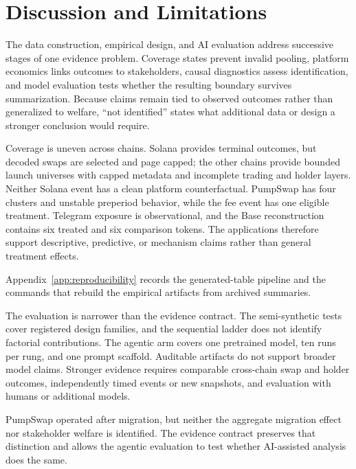 \documentclass{article}
\begin{document}
\section{Discussion and Limitations}
\label{sec:discussion}

The data construction, empirical design, and AI evaluation address successive stages of one evidence problem. Coverage states prevent invalid pooling, platform economics links outcomes to stakeholders, causal diagnostics assess identification, and model evaluation tests whether the resulting boundary survives summarization. Because claims remain tied to observed outcomes rather than generalized to welfare, ``not identified'' states what additional data or design a stronger conclusion would require.

Coverage is uneven across chains. Solana provides terminal outcomes, but decoded swaps are selected and page capped; the other chains provide bounded launch universes with capped metadata and incomplete trading and holder layers. Neither Solana event has a clean platform counterfactual. PumpSwap has four clusters and unstable preperiod behavior, while the fee event has one eligible treatment. Telegram exposure is observational, and the Base reconstruction contains six treated and six comparison tokens. The applications therefore support descriptive, predictive, or mechanism claims rather than general treatment effects.

Appendix~\ref{app:reproducibility} records the generated-table pipeline and the commands that rebuild the empirical artifacts from archived summaries.

The evaluation is narrower than the evidence contract. The semi-synthetic tests cover registered design families, and the sequential ladder does not identify factorial contributions. The agentic arm covers one pretrained model, ten runs per rung, and one prompt scaffold. Auditable artifacts do not support broader model claims. Stronger evidence requires comparable cross-chain swap and holder outcomes, independently timed events or new snapshots, and evaluation with humans or additional models.

PumpSwap operated after migration, but neither the aggregate migration effect nor stakeholder welfare is identified. The evidence contract preserves that distinction and allows the agentic evaluation to test whether AI-assisted analysis does the same.

\clearpage


\end{document}
